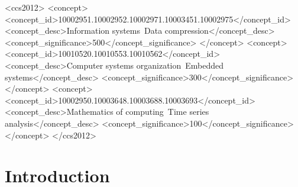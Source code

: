 \documentclass[acmlarge]{acmart}
\begin{document}
\begin{CCSXML}
<ccs2012>
 <concept>
  <concept_id>10002951.10002952.10002971.10003451.10002975</concept_id>
  <concept_desc>Information systems~Data compression</concept_desc>
  <concept_significance>500</concept_significance>
 </concept>
 <concept>
  <concept_id>10010520.10010553.10010562</concept_id>
  <concept_desc>Computer systems organization~Embedded systems</concept_desc>
  <concept_significance>300</concept_significance>
 </concept>
 <concept>
  <concept_id>10002950.10003648.10003688.10003693</concept_id>
  <concept_desc>Mathematics of computing~Time series analysis</concept_desc>
  <concept_significance>100</concept_significance>
 </concept>
</ccs2012>
\end{CCSXML}







\maketitle


\section{Introduction} \label{sec:intro}
\end{document}
